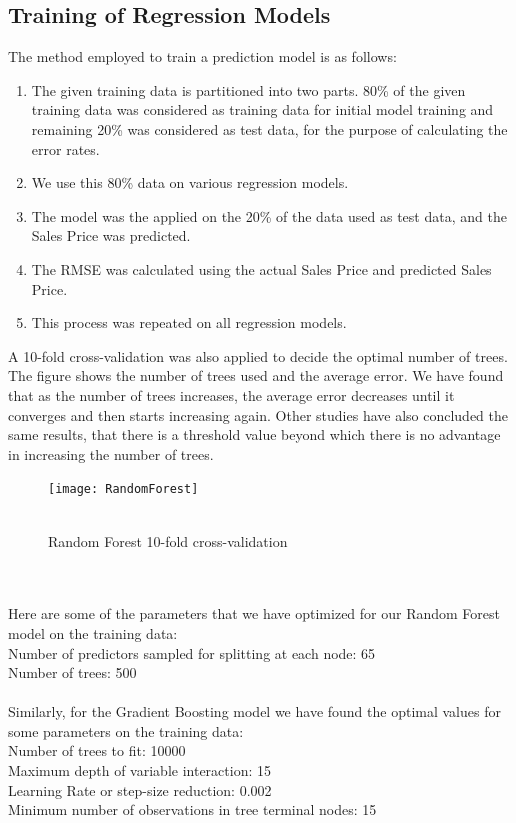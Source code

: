 \documentclass[fleqn,10pt]{SelfArx} %
\begin{document}
\subsection{Training of Regression Models}
The method employed to train a prediction model is as follows:
\begin{enumerate}[noitemsep]
\item The given training data is partitioned into two parts. 80\% of the given training data was considered as training data for initial model training and remaining 20\% was considered as test data, for the purpose of calculating the error rates.
\item We use this 80\% data on various regression models.
\item The model was the applied on the 20\% of the data used as test data, and the Sales Price was predicted.
\item The RMSE was calculated using the actual Sales Price and predicted Sales Price.
\item This process was repeated on all regression models.
\end{enumerate}
A 10-fold cross-validation was also applied to decide the optimal number of trees. The figure shows the number of trees used and the average error. We have found that as the number of trees increases, the average error decreases until it converges and then starts increasing again. Other studies have also concluded the same results, that there is a threshold value beyond which there is no advantage in increasing the number of trees.
\begin{figure}[h]\centering
\texttt{[image: RandomForest]}
\\ \caption{\\ Random Forest 10-fold cross-validation}
\end{figure}
\\ \\ Here are some of the parameters that we have optimized for our Random Forest model on the training data:
\\ Number of predictors sampled for splitting at each node: 65
\\ Number of trees: 500
\\ \\ Similarly, for the Gradient Boosting model we have found the optimal values for some parameters on the training data:
\\ Number of trees to fit: 10000
\\ Maximum depth of variable interaction: 15
\\ Learning Rate or step-size reduction: 0.002
\\ Minimum number of observations in tree terminal nodes: 15
\end{document}
